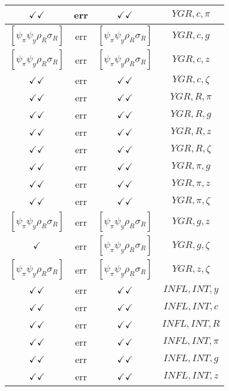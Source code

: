\documentclass[a4paper,10pt]{article}
\begin{document}
\begin{longtable}{|c|c|c|c|}
\hline
$\checkmark\checkmark$ & err & $\checkmark\checkmark$ & ${YGR},{c},{\pi}$ \\
\hline
$[\psi_\pi \psi_y \rho_R \sigma_R ]$ & err & $[\psi_\pi \psi_y \rho_R \sigma_R ]$ & ${YGR},{c},{g}$ \\
\hline
$[\psi_\pi \psi_y \rho_R \sigma_R ]$ & err & $[\psi_\pi \psi_y \rho_R \sigma_R ]$ & ${YGR},{c},{z}$ \\
\hline
$\checkmark\checkmark$ & err & $\checkmark\checkmark$ & ${YGR},{c},{\zeta}$ \\
\hline
$\checkmark\checkmark$ & err & $\checkmark\checkmark$ & ${YGR},{R},{\pi}$ \\
\hline
$\checkmark\checkmark$ & err & $\checkmark\checkmark$ & ${YGR},{R},{g}$ \\
\hline
$\checkmark\checkmark$ & err & $\checkmark\checkmark$ & ${YGR},{R},{z}$ \\
\hline
$\checkmark\checkmark$ & err & $\checkmark\checkmark$ & ${YGR},{R},{\zeta}$ \\
\hline
$\checkmark\checkmark$ & err & $\checkmark\checkmark$ & ${YGR},{\pi},{g}$ \\
\hline
$\checkmark\checkmark$ & err & $\checkmark\checkmark$ & ${YGR},{\pi},{z}$ \\
\hline
$\checkmark\checkmark$ & err & $\checkmark\checkmark$ & ${YGR},{\pi},{\zeta}$ \\
\hline
$[\psi_\pi \psi_y \rho_R \sigma_R ]$ & err & $[\psi_\pi \psi_y \rho_R \sigma_R ]$ & ${YGR},{g},{z}$ \\
\hline
$\checkmark$ & err & $[\psi_\pi \psi_y \rho_R \sigma_R ]$ & ${YGR},{g},{\zeta}$ \\
\hline
$[\psi_\pi \psi_y \rho_R \sigma_R ]$ & err & $[\psi_\pi \psi_y \rho_R \sigma_R ]$ & ${YGR},{z},{\zeta}$ \\
\hline
$\checkmark\checkmark$ & err & $\checkmark\checkmark$ & ${INFL},{INT},{y}$ \\
\hline
$\checkmark\checkmark$ & err & $\checkmark\checkmark$ & ${INFL},{INT},{c}$ \\
\hline
$\checkmark\checkmark$ & err & $\checkmark\checkmark$ & ${INFL},{INT},{R}$ \\
\hline
$\checkmark\checkmark$ & err & $\checkmark\checkmark$ & ${INFL},{INT},{\pi}$ \\
\hline
$\checkmark\checkmark$ & err & $\checkmark\checkmark$ & ${INFL},{INT},{g}$ \\
\hline
$\checkmark\checkmark$ & err & $\checkmark\checkmark$ & ${INFL},{INT},{z}$ \\

\end{longtable}
\end{document}
